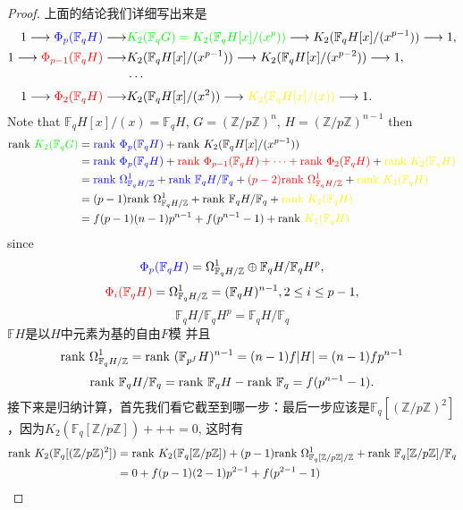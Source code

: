 \begin{proof}
上面的结论我们详细写出来是
\begin{align*}
1 \longrightarrow {\color{blue}{\color{blue} \Phi_p(\mathbb{F}_q H)}} \longrightarrow   &{\color{green}K_2( \mathbb{F}_q G)=K_2 (\mathbb{F}_q H[x]/(x^p))}  \longrightarrow K_2(\mathbb{F}_q H[x]/(x^{p-1})) \longrightarrow 1, \\
1 \longrightarrow {\color{red} \Phi_{p-1}(\mathbb{F}_q H)} \longrightarrow  &K_2 (\mathbb{F}_q H[x]/(x^{p-1}))  \longrightarrow K_2(\mathbb{F}_q H[x]/(x^{p-2})) \longrightarrow 1, \\
& \cdots \\
1 \longrightarrow {\color{red} \Phi_2(\mathbb{F}_q H)} \longrightarrow & K_2 (\mathbb{F}_q H[x]/(x^2))  \longrightarrow {\color{yellow} K_2(\mathbb{F}_q H[x]/(x))} \longrightarrow 1. \\
\end{align*}
Note that $\mathbb{F}_q H[x]/(x)=\mathbb{F}_q H$, $G=(\mathbb{Z}/p \mathbb{Z})^n$, $H=(\mathbb{Z}/p \mathbb{Z})^{n-1}$
then
\begin{align*}
\rank {\color{green}K_2 (\mathbb{F}_q G)} & = {\color{blue}\rank  \Phi_p(\mathbb{F}_q H)} + \rank K_2(\mathbb{F}_q H[x]/(x^{p-1})) \\
&= {\color{blue}\rank  \Phi_p(\mathbb{F}_q H)} + {\color{red} \rank \Phi_{p-1}(\mathbb{F}_q H) +\cdots +\rank \Phi_2(\mathbb{F}_q H)} +{\color{yellow} \rank K_2(\mathbb{F}_q H)}  \\
& ={\color{blue}\rank  \Omega^1_{\mathbb{F}_q H/\mathbb{Z}}} + {\color{blue}\rank  \mathbb{F}_q H/\mathbb{F}_q} + {\color{red} (p-2) \rank \Omega^1_{\mathbb{F}_q H/\mathbb{Z}}} + {\color{yellow} \rank K_2(\mathbb{F}_q H)}  \\
& = (p-1)\rank \Omega^1_{\mathbb{F}_q H/\mathbb{Z}} + \rank \mathbb{F}_q H/\mathbb{F}_q+ {\color{yellow} \rank K_2(\mathbb{F}_q H)}  \\
& = f(p-1)(n-1)p^{n-1} + f(p^{n-1}-1) +\rank  {\color{yellow} K_2(\mathbb{F}_q H)}
\end{align*}
since 
\[{\color{blue} \Phi_p(\mathbb{F}_q H)} = \Omega^1_{\mathbb{F}_q H/\mathbb{Z}} \oplus \mathbb{F}_q H/\mathbb{F}_q H^p,\]
\[ {\color{red}\Phi_i(\mathbb{F}_q H)} = \Omega^1_{\mathbb{F}_q H/\mathbb{Z}}= (\mathbb{F}_q H)^{n-1}, 2\leq i \leq p-1,\]
\[\mathbb{F}_q H/\mathbb{F}_q H^p= \mathbb{F}_q H/\mathbb{F}_q\] 
$\mathbb{F} H$是以$H$中元素为基的自由$F$模
并且
\[\mathrm{rank\ } \Omega^1_{\mathbb{F}_q H/\mathbb{Z}}= \mathrm{rank\ } (\mathbb{F}_{p^f} H)^{n-1} = (n-1)f|H|=(n-1)fp^{n-1}\]
\[\mathrm{rank\ } \mathbb{F}_q H/\mathbb{F}_q = \mathrm{rank\ } \mathbb{F}_q H- \mathrm{rank\ } \mathbb{F}_q = f(p^{n-1}-1).\]
接下来是归纳计算，首先我们看它截至到哪一步：最后一步应该是$\mathbb{F}_q[(\mathbb{Z}/p \mathbb{Z})^2]$，因为$K_2(\mathbb{F}_q[\mathbb{Z}/p \mathbb{Z}])+++=0$, 这时有
\begin{align*}
\mathrm{rank\ } K_2(\mathbb{F}_q[(\mathbb{Z}/p \mathbb{Z})^2])&=\mathrm{rank\ } K_2(\mathbb{F}_q[\mathbb{Z}/p \mathbb{Z}])+ (p- 1) \mathrm{rank\ } \Omega^1_{\mathbb{F}_q [\mathbb{Z}/p \mathbb{Z}]/\mathbb{Z}}+  \mathrm{rank\ } \mathbb{F}_q[\mathbb{Z}/p \mathbb{Z}]/\mathbb{F}_q\\
& = 0+f(p-1)(2-1)p^{2-1} +f(p^{2-1}-1)
\end{align*}


\end{proof}
